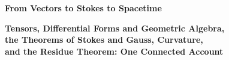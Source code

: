 \begin{center}
{\LARGE\bfseries From Vectors to Stokes to Spacetime\par}
\vspace{0.6em}
{\Large\bfseries Tensors, Differential Forms and Geometric Algebra,\\[2pt]
the Theorems of Stokes and Gauss, Curvature,\\[2pt]
and the Residue Theorem: One Connected Account\par}
\end{center}
\vspace{0.4em}
